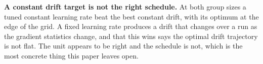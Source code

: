\textbf{A constant drift target is not the right schedule.} At both group sizes a tuned constant
learning rate beat the best constant drift, with its optimum at the edge of the grid. A fixed
learning rate produces a drift that changes over a run as the gradient statistics change, and that
this wins says the optimal drift trajectory is not flat. The unit appears to be right and the
schedule is not, which is the most concrete thing this paper leaves open.
